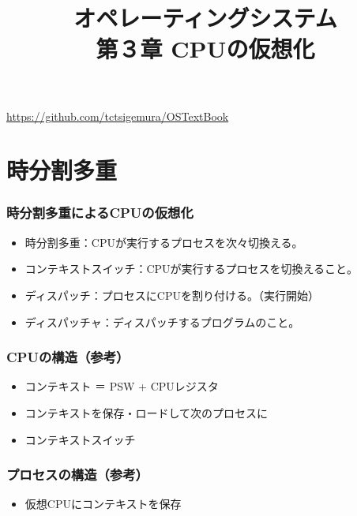 \documentclass[unicode]{beamer}                   %
\begin{document}
\title[CPUの仮想化]{オペレーティングシステム\\第３章 CPUの仮想化}
\date{}
\begin{frame}
  \titlepage
  \centerline{\url{https://github.com/tctsigemura/OSTextBook}}
\end{frame}


\section{時分割多重}
\begin{frame}
  \frametitle{時分割多重によるCPUの仮想化}
  \begin{itemize}
    \item 時分割多重：CPUが実行するプロセスを次々切換える。
    \item コンテキストスイッチ：CPUが実行するプロセスを切換えること。
    \item ディスパッチ：プロセスにCPUを割り付ける。（実行開始）
    \item ディスパッチャ：ディスパッチするプログラムのこと。
  \end{itemize}
\end{frame}

\begin{frame}
  \frametitle{CPUの構造（参考）}
  \begin{itemize}
    \item コンテキスト ＝ PSW + CPUレジスタ
    \item コンテキストを保存・ロードして次のプロセスに
    \item コンテキストスイッチ
  \end{itemize}
\end{frame}

\begin{frame}
  \frametitle{プロセスの構造（参考）}
  \begin{itemize}
    \item 仮想CPUにコンテキストを保存
  \end{itemize}
\end{frame}
\end{document}
